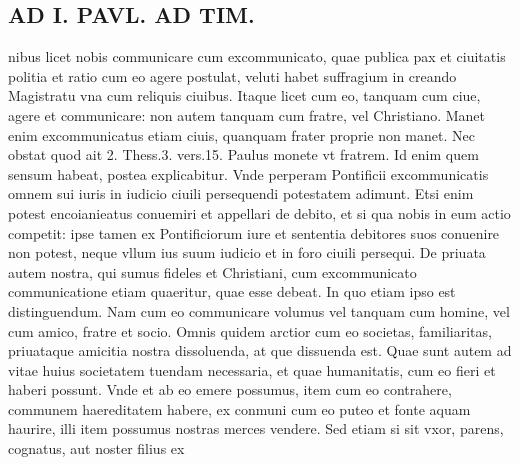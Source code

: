 \documentclass{article}
\begin{document}
\begin{pages}
\section*{AD I. PAVL. AD TIM. }
\marginpar{[ p.404 ]}\pstart nibus licet nobis communicare cum excommunicato, quae publica pax et ciuitatis politia et ratio cum eo agere postulat, veluti habet suffragium in creando Magistratu vna cum reliquis ciuibus. Itaque licet cum eo, tanquam cum ciue, agere et communicare: non autem tanquam cum fratre, vel Christiano. Manet enim excommunicatus etiam ciuis, quanquam frater proprie non manet. Nec obstat quod ait 2. Thess.3. vers.15. Paulus monete vt fratrem. Id enim quem sensum habeat, postea explicabitur. Vnde perperam Pontificii excommunicatis omnem sui iuris in iudicio ciuili persequendi potestatem adimunt. Etsi enim potest encoianieatus conuemiri et appellari de debito, et si qua nobis in eum actio competit: ipse tamen ex Pontificiorum iure et sententia debitores suos conuenire non potest, neque vllum ius suum iudicio et in foro ciuili persequi.  \pend\pstart De priuata autem nostra, qui sumus fideles et Christiani, cum excommunicato communicatione etiam quaeritur, quae esse debeat. In quo etiam ipso est distinguendum. Nam cum eo communicare volumus vel tanquam cum homine, vel cum amico, fratre et socio. Omnis quidem arctior cum eo societas, familiaritas, priuataque amicitia nostra dissoluenda, at que dissuenda est. Quae sunt autem ad vitae huius societatem tuendam necessaria, et quae humanitatis, cum eo fieri et haberi possunt. Vnde et ab eo emere possumus, item cum eo contrahere, communem haereditatem habere, ex conmuni cum eo puteo et fonte aquam haurire, illi item possumus nostras merces vendere. Sed etiam si sit vxor, parens, cognatus, aut noster filius ex\pend

\end{pages}
\end{document}
